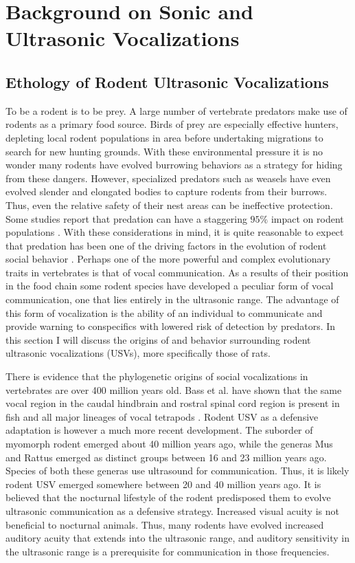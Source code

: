 \documentclass[12pt, letter]{report}
\begin{document}
\chapter{Background on Sonic and Ultrasonic Vocalizations}
\section{Ethology of Rodent Ultrasonic Vocalizations}
To be a rodent is to be prey. A large number of vertebrate predators make use of rodents as a primary food source. Birds of prey are especially effective hunters, depleting local rodent populations in area before undertaking migrations to search for new hunting grounds. With these environmental pressure it is no wonder many rodents have evolved burrowing behaviors as a strategy for hiding from these dangers. However, specialized predators such as weasels have even evolved slender and elongated bodies to capture rodents from their burrows. Thus, even the relative safety of their nest areas can be ineffective protection. Some studies report that predation can have a staggering $95 \%$ impact on rodent populations \cite{Jedrzejewski1993}. With these considerations in mind, it is quite reasonable to expect that predation has been one of the driving factors in the evolution of rodent social behavior \cite{Brudzynski2010}. Perhaps one of the more powerful and complex evolutionary traits in vertebrates is that of vocal communication. As a results of their position in the food chain some rodent species have developed a peculiar form of vocal communication, one that lies entirely in the ultrasonic range. The advantage of this form of vocalization is the ability of an individual to communicate and provide warning to conspecifics with lowered risk of detection by predators. In this section I will discuss the origins of and behavior surrounding rodent ultrasonic vocalizations (USVs), more specifically those of rats. 

There is evidence that the phylogenetic origins of social vocalizations in vertebrates are over 400 million years old. Bass et al. have shown that the same vocal region in the caudal hindbrain and rostral spinal cord region is present in fish and all major lineages of vocal tetrapods \cite{Bass2008}. Rodent USV as a defensive adaptation is however a much more recent development. The suborder of myomorph rodent emerged about 40 million years ago, while the generas Mus and Rattus emerged as distinct groups between 16 and 23 million years ago. Species of both these generas use ultrasound for communication. Thus, it is likely rodent USV emerged somewhere between 20 and 40 million years ago. It is believed that the nocturnal lifestyle of the rodent predisposed them to evolve ultrasonic communication as a defensive strategy. Increased visual acuity is not beneficial to nocturnal animals. Thus, many rodents have evolved increased auditory acuity that extends into the ultrasonic range, and auditory sensitivity in the ultrasonic range is a prerequisite for communication in those frequencies.
\end{document}
